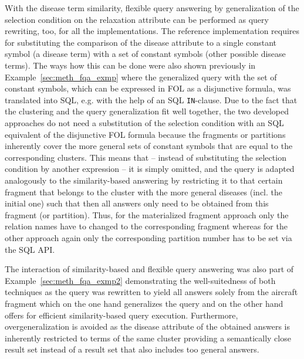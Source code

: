 With the disease term similarity, flexible query answering by generalization of the selection condition on the relaxation attribute can be performed
as query rewriting, too, for all the implementations. The reference implementation requires for substituting the comparison of the disease attribute to a 
single constant symbol (a disease term) with a set of constant symbols (other possible disease terms). The ways how this can be done were also shown previously 
in Example~\ref{sec:meth_fqa_exmp} where the generalized query with the set of constant symbols, which can be expressed in FOL as a disjunctive formula, was
translated into SQL, e.g. with the help of an SQL \verb!IN!-clause. Due to the fact that the clustering and the query generalization fit well together, the two
developed approaches do not need a substitution of the selection condition with an SQL equivalent of the disjunctive FOL formula because the fragments or
partitions inherently cover the more general sets of constant symbols that are equal to the corresponding clusters. This means that -- instead of substituting
the selection condition by another expression -- it is simply omitted, and the query is adapted analogously to the similarity-based answering by restricting it 
to that certain fragment that belongs to the cluster with the more general diseases (incl. the initial one) such that then all answers only need to be obtained
from this fragment (or partition). Thus, for the materialized fragment approach only the relation names have to changed to the corresponding fragment whereas
for the other approach again only the corresponding partition number has to be set via the SQL API. 

The interaction of similarity-based and flexible query answering was also part of Example~\ref{sec:meth_fqa_exmp2} demonstrating the well-suitedness of both
techniques as the query was rewritten to yield all answers solely from the aircraft fragment which on the one hand generalizes the query and on the other hand
offers for efficient similarity-based query execution. Furthermore, overgeneralization \citep{Wiese2014} is avoided as the disease attribute of the obtained 
answers is inherently restricted to terms of the same cluster providing a semantically close result set instead of a result set that also includes too general
answers.
